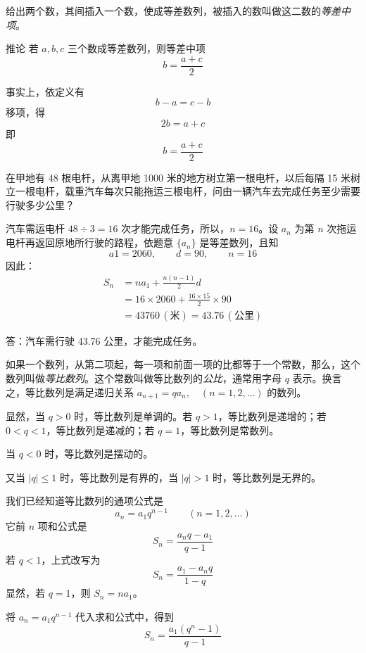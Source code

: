 \begin{Definition}
  给出两个数，其间插入一个数，使成等差数列，被插入的数叫做这二数的\emph{等差中项}。
\end{Definition}

\begin{Deduction}{推论}
  若 $a,b,c$ 三个数成等差数列，则等差中项 \[b=\frac{a+c}{2}\]
\end{Deduction}
 
事实上，依定义有
\[b-a=c-b\]
移项，得
\[2b=a+c\]
即
\[b=\frac{a+c}{2}\]
    
\begin{example}
  在甲地有 48 根电杆，从离甲地 1000 米的地方树立第一根电杆，以后每隔 15 米树立一根电杆，载重汽车每次只能拖运三根电杆，问由一辆汽车去完成任务至少需要行驶多少公里？
\end{example}

\begin{solution}
  汽车需运电杆 $48\div 3=16$ 次才能完成任务，所以，$n=16$。设 $a_n$ 为第 $n$ 次拖运电杆再返回原地所行驶的路程，依题意 $\{a_n\}$ 是等差数列，且知 
\[    a1=2060,\qquad d=90,\qquad n=16\]
因此：
\[\begin{split}
    S_n&=na_1+\frac{n(n-1)}{2}d\\
    &=16\times 2060+\frac{16\times 15}{2}\times 90\\
    &=43760\,\unit{(\text{米})}=43.76\,\unit{(\text{公里})}
\end{split}\]

答：汽车需行驶 43.76 公里，才能完成任务。
\end{solution}

\bigskip
如果一个数列，从第二项起，每一项和前面一项的比都等于一个常数，那么，这个数列叫做\emph{等比数列}。这个常数叫做等比数列的\emph{公比}，通常用字母 $q$ 表示。换言之，等比数列是满足递归关系 $a_{n+1}=qa_{n},\quad (n=1,2,\ldots)$ 的数列。

显然，当 $q>0$ 时，等比数列是单调的。若 $q>1$，等比数列是递增的；若 $0<q<1$，等比数列是递减的；若 $q=1$，等比数列是常数列。

当 $q<0$ 时，等比数列是摆动的。

又当 $|q|\leqslant 1$ 时，等比数列是有界的，当 $|q|>1$ 时，等比数列是无界的。

我们已经知道等比数列的通项公式是
\[a_n=a_1q^{n-1}\qquad (n=1,2,\ldots)\]
它前 $n$ 项和公式是
\[S_n=\frac{a_nq-a_1}{q-1}\]
若 $q<1$，上式改写为
\[S_n=\frac{a_1-a_nq}{1-q}\]
显然，若 $q=1$，则 $S_n=na_1$。

将 $a_n=a_1q^{n-1}$ 代入求和公式中，得到
\[S_n=\frac{a_1(q^n-1)}{q-1}\]


